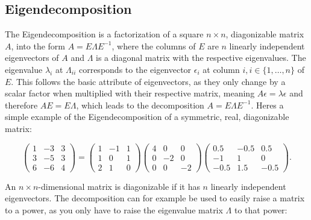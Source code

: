 \subsection{Eigendecomposition}

The Eigendecomposition is a factorization of a square $n \times n$,
diagonizable matrix $A$, into the form $A = E \Lambda E^{-1}$, where the
columns of $E$ are $n$ linearly independent eigenvectors of $A$ and
$\Lambda$ is a diagonal matrix with the respective eigenvalues. The
eigenvalue $\lambda_i$ at $\Lambda_{ii}$ corresponds to the eigenvector
$\epsilon_i$ at column $i, i \in \{1,\dots,n\}$ of $E$. This follows the
basic attribute of eigenvectors, as they only change by a scalar factor
when multiplied with their respective matrix, meaning $A \epsilon =
\lambda \epsilon$ and therefore $A E = E \Lambda$, which leads to the
decomposition $A = E \Lambda E^{-1}$. Heres a simple example of the
Eigendecomposition of a symmetric, real, diagonizable matrix:

\begin{equation}
  \begin{pmatrix}
    1 & {-3} & 3\\
    3 & {-5} & 3\\
    6 & {-6} & 4
  \end{pmatrix}
  =
  \begin{pmatrix}
    1 & {-1} & 1\\
    1 & 0 & 1\\
    2 & 1 & 0
  \end{pmatrix}
  \begin{pmatrix}
    4 & 0 & 0\\
    0 & {-2} & 0\\
    0 & 0 & {-2}
  \end{pmatrix}
  \begin{pmatrix}
    0.5 & {-0.5} & 0.5\\
    {-1} & 1 & 0\\
    {-0.5} & 1.5 & {-0.5}
  \end{pmatrix}
  .
\end{equation}

\noindent An $n \times n$-dimensional matrix is diagonizable if it has
$n$ linearly independent eigenvectors. The decomposition can for example
be used to easily raise a matrix to a power, as you only have to raise
the eigenvalue matrix $\Lambda$ to that power:

